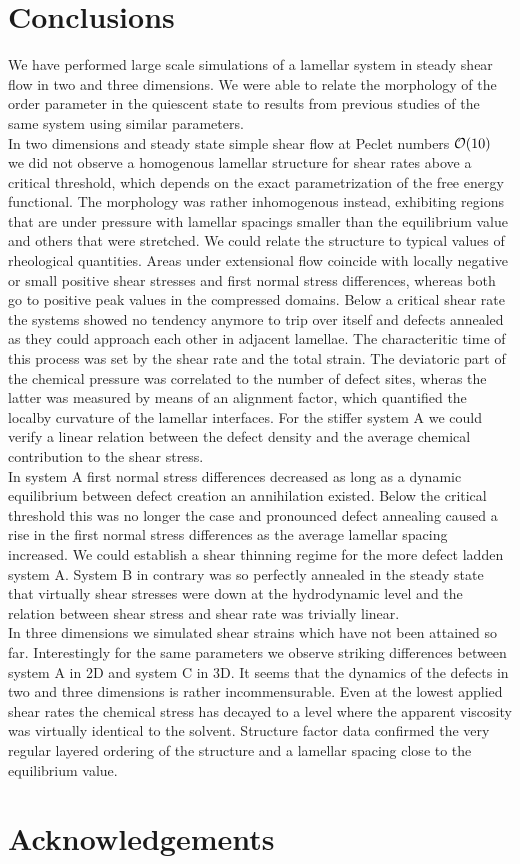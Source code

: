 \documentclass[8.5pt,twoside,twocolumn]{article}
\begin{document}
\section{Conclusions}
We have performed large scale simulations of a lamellar system in steady shear flow  in two and three dimensions.
We were able to relate the morphology of the order parameter in the quiescent state to results from previous studies of the same system using similar parameters.\\
In two dimensions and steady state simple shear flow at Peclet numbers ${\cal O}(10)$ we did not observe a homogenous lamellar structure for shear rates above a critical threshold, which depends on the exact parametrization of the free energy functional.
The morphology was rather inhomogenous instead, exhibiting regions that are under pressure with lamellar spacings smaller than the equilibrium value and others that were stretched.
We could relate the structure to typical values of rheological quantities.
Areas under extensional flow coincide with locally negative or small positive shear stresses and first normal stress differences, whereas both go to positive peak values in the compressed domains.
Below a critical shear rate the systems showed no tendency anymore to trip over itself and defects annealed as they could approach each other in adjacent lamellae.
The characteritic time of this process was set by the shear rate and the total strain.
The deviatoric part of the chemical pressure was correlated to the number of defect sites, wheras the latter was measured by means of an alignment factor, which quantified the localby curvature of the lamellar interfaces.
For the stiffer system A we could verify a linear relation between the defect density and the average chemical contribution to the shear stress.\\ 
In system A first normal stress differences decreased as long as a dynamic equilibrium between defect creation an annihilation existed.
Below the critical threshold this was no longer the case and pronounced defect annealing caused a rise in the first normal stress differences as the average lamellar spacing increased.
We could establish a shear thinning regime for the more defect ladden system A.
System B in contrary was so perfectly annealed in the steady state that virtually shear stresses were down at the hydrodynamic level and the relation between shear stress and shear rate was trivially linear.\\
In three dimensions we simulated shear strains which have not been attained so far.
Interestingly for the same parameters we observe striking differences between system A in 2D and system C in 3D.
It seems that the dynamics of the defects in two and three dimensions is rather incommensurable.
Even at the lowest applied shear rates the chemical stress has decayed to a level where the apparent viscosity was virtually identical to the solvent.
Structure factor data confirmed the very regular layered ordering of the structure and a lamellar spacing close to the equilibrium value. 


\section{Acknowledgements}


\footnotesize{
}
\end{document}
